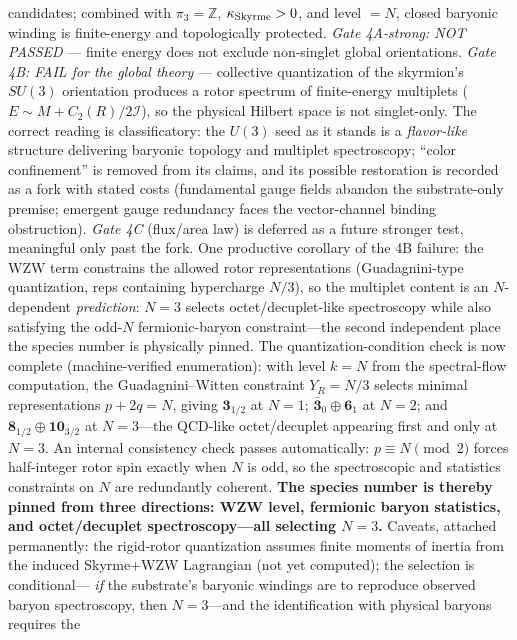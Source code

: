 \documentclass[11pt,a4paper]{article}
\begin{document}
candidates; combined with $\pi_3 = \mathbb{Z}$,
$\kappa_{\rm Skyrme} > 0$, and level $= N$, closed baryonic
winding is finite-energy and topologically protected.
\emph{Gate 4A-strong: NOT PASSED} --- finite energy does not
exclude non-singlet global orientations.
\emph{Gate 4B: FAIL for the global theory} --- collective
quantization of the skyrmion's $SU(3)$ orientation produces a
rotor spectrum of finite-energy multiplets
($E \sim M + C_2(R)/2\mathcal{I}$), so the physical Hilbert
space is not singlet-only.  The correct reading is
classificatory: the $U(3)$ seed as it stands is a
\emph{flavor-like} structure delivering baryonic topology and
multiplet spectroscopy; ``color confinement'' is removed from
its claims, and its possible restoration is recorded as a fork
with stated costs (fundamental gauge fields abandon the
substrate-only premise; emergent gauge redundancy faces the
vector-channel binding obstruction).
\emph{Gate 4C} (flux/area law) is deferred as a future stronger
test, meaningful only past the fork.
One productive corollary of the 4B failure: the WZW term
constrains the allowed rotor representations
(Guadagnini-type quantization, reps containing hypercharge
$N/3$), so the multiplet content is an $N$-dependent
\emph{prediction}: $N = 3$ selects octet/decuplet-like
spectroscopy while also satisfying the odd-$N$ fermionic-baryon
constraint---the second independent place the species number is
physically pinned.  The quantization-condition check is now complete
(machine-verified enumeration): with level $k = N$ from the
spectral-flow computation, the Guadagnini--Witten constraint
$Y_R = N/3$ selects minimal representations $p + 2q = N$, giving
$\mathbf{3}_{1/2}$ at $N{=}1$;
$\bar{\mathbf{3}}_0 \oplus \mathbf{6}_1$ at $N{=}2$; and
$\mathbf{8}_{1/2} \oplus \mathbf{10}_{3/2}$ at $N{=}3$---the
QCD-like octet/decuplet appearing first and only at $N = 3$.
An internal consistency check passes automatically:
$p \equiv N \pmod 2$ forces half-integer rotor spin exactly when
$N$ is odd, so the spectroscopic and statistics constraints on
$N$ are redundantly coherent.  \textbf{The species number is
thereby pinned from three directions: WZW level, fermionic
baryon statistics, and octet/decuplet spectroscopy---all
selecting $N = 3$.}
Caveats, attached permanently: the rigid-rotor quantization
assumes finite moments of inertia from the induced Skyrme+WZW
Lagrangian (not yet computed); the selection is conditional---%
\emph{if} the substrate's baryonic windings are to reproduce
observed baryon spectroscopy, then $N = 3$---and the
identification with physical baryons requires the
\end{document}
